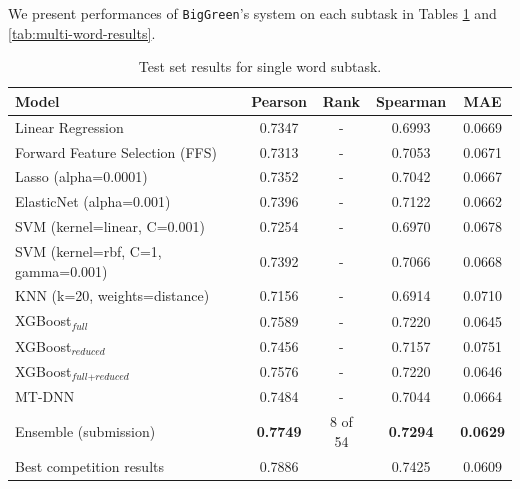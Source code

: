 \documentclass{dcthesis}
\theoremstyle{definition}
\theoremstyle{remark}
\begin{document}
\vspace*{-\baselineskip}

We present performances of \texttt{BigGreen}'s system on each subtask in Tables \ref{tab:single-word-results} and \ref{tab:multi-word-results}.

\begin{table}[!htbp]
  \centering
  \begin{tabular}{l|cccc}
    \hline \textbf{Model} & \textbf{Pearson} & \textbf{Rank} & \textbf{Spearman} & \textbf{MAE} \\ \hline
    Linear Regression	& 0.7347 & - &	0.6993 &	0.0669 \\
    Forward Feature Selection (FFS)	& 0.7313 & - &	0.7053 & 0.0671 \\
    Lasso (alpha=0.0001) &	0.7352 & - &	0.7042 & 	0.0667 \\
    ElasticNet (alpha=0.001) &	0.7396 & - &	0.7122 &	0.0662 \\
    SVM (kernel=linear, C=0.001) &	0.7254 & - &	0.6970 &	0.0678 \\
    SVM (kernel=rbf, C=1, gamma=0.001) &	0.7392 & - &	0.7066 &	0.0668 \\
    KNN (k=20, weights=distance) &	0.7156 & -	& 0.6914 &	0.0710 \\
    \hline
    XGBoost$_\textit{full}$ &	0.7589 & - &	0.7220 &	0.0645 \\
    XGBoost$_\textit{reduced}$ &	0.7456 & - &	0.7157 &	0.0751 \\
    XGBoost$_{\textit{full}+\textit{reduced}}$ & 0.7576 & - & 0.7220 & 0.0646 \\
    MT-DNN & 0.7484 & -	& 0.7044 & 0.0664 \\
    Ensemble (submission) & \textbf{0.7749} & 8 of 54 & \textbf{0.7294} & \textbf{0.0629} \\
    \hline
    Best competition results & 0.7886 & & 0.7425 & 0.0609 \\ 
    \hline
  \end{tabular}
  \caption{\label{tab:single-word-results} Test set results for single word subtask. }
\end{table}
\end{document}
